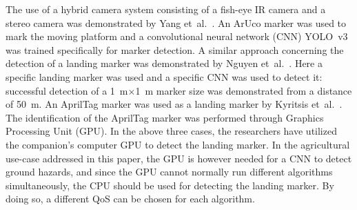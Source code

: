 \documentclass[conference, onecolumn, draftclsnofoot]{IEEEtran}
\begin{document}


The use of a hybrid camera system consisting of a fish-eye IR camera
and a stereo camera was demonstrated by Yang
et~al.~\cite{yang2018hybrid}. An ArUco marker was used to mark the
moving platform and a convolutional neural network (CNN) YOLO~v3 was
trained specifically for marker detection. A similar approach
concerning the detection of a landing marker was demonstrated by
Nguyen et~al.~\cite{nguyen2018lightdenseyolo}. Here a specific landing
marker was used and a specific CNN was used to detect it: successful
detection of a \SI{1}{\m}$\times$\SI{1}{\m} marker size was demonstrated from a
distance of \SI{50}{\m}. An AprilTag marker was used as a landing marker by
Kyritsis et~al.~\cite{kyristsis2016towards}. The identification of the AprilTag marker
was performed through Graphics Processing Unit (GPU). In the above three cases, the researchers
have utilized the companion's computer GPU to detect the landing
marker. In the agricultural use-case addressed in this paper, the GPU
is however needed for a CNN to detect ground hazards, and since the
GPU cannot normally run different algorithms simultaneously,
%
%
the CPU should be used for detecting the landing marker. By doing so,
a different QoS can be chosen for each algorithm.  


\end{document}
